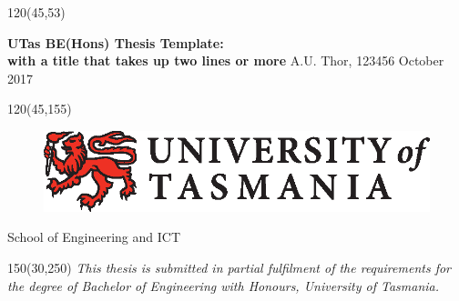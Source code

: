 \begin{textblock}{120}(45,53) %
\noindent\begin{minipage}[t][55mm][c]{\textwidth} 
\centering \Large  %
\vspace*{\fill}
{\bf UTas BE(Hons) Thesis Template:\\ with a title that takes up two lines or more}
\vfill
A.U. Thor, 123456 
\vfill
\large October 2017
\vspace*{\fill}
\end{minipage}
\end{textblock}

\begin{textblock}{120}(45,155)
\centering
\begin{figure}[h]
\centering\includegraphics[width=0.75\linewidth]{UTAS-Logo-colour.eps}
\end{figure}
\vspace{2cm}
\Large
School of Engineering and ICT


\end{textblock}


\begin{textblock}{150}(30,250)
\centering
\emph{This thesis is submitted in partial fulfilment of the requirements for the degree of
Bachelor of Engineering with Honours,
University of Tasmania.}
\end{textblock}



\null\cleardoublepage
{}
